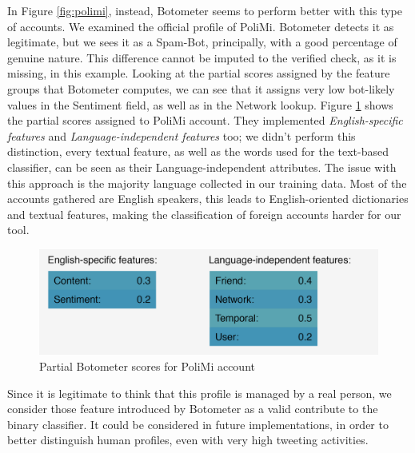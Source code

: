 In Figure \ref{fig:polimi}, instead, Botometer seems to perform better with this type of accounts. We examined the official profile of PoliMi. Botometer detects it as legitimate, but we sees it as a Spam-Bot, principally, with a good percentage of genuine nature. This difference cannot be imputed to the verified check, as it is missing, in this example.
Looking at the partial scores assigned by the feature groups that Botometer computes, we can see that it assigns very low bot-likely values in the Sentiment field, as well as in the Network lookup. Figure \ref{fig:polimi_details} shows the partial scores assigned to PoliMi account. They implemented \textit{English-specific features} and \textit{Language-independent features} too; we didn't perform this distinction, every textual feature, as well as the words used for the text-based classifier, can be seen as their Language-independent attributes. The issue with this approach is the majority language collected in our training data. Most of the accounts gathered are English speakers, this leads to English-oriented dictionaries and textual features, making the classification of foreign accounts harder for our tool.
\begin{figure}[htp!]
	\begin{center}
		\includegraphics[width=0.8\columnwidth]{chapter7/figure/polimi_details.png}\par
	\end{center}
	\caption{Partial Botometer scores for PoliMi account}
	\label{fig:polimi_details}
\end{figure}

Since it is legitimate to think that this profile is managed by a real person, we consider those feature introduced by Botometer as a valid contribute to the binary classifier. It could be considered in future implementations, in order to better distinguish human profiles, even with very high tweeting activities.
